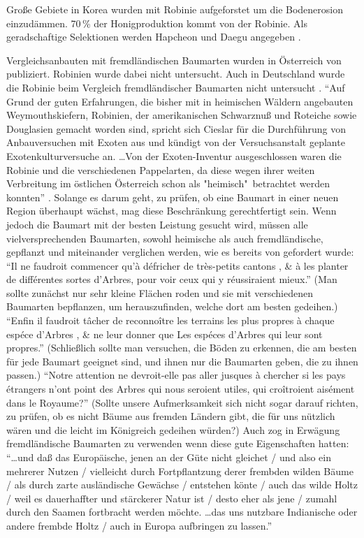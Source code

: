 \documentclass[twocolumn]{scrartcl}
\begin{document}
Große Gebiete in Korea wurden mit Robinie aufgeforstet um die
Bodenerosion einzudämmen. 70\,\% der Honigproduktion kommt von der
Robinie. Als geradschaftige Selektionen werden Hapcheon und Daegu
angegeben \citep{lee2007robinieKorea}.

Vergleichsanbauten mit fremdländischen Baumarten wurden in Österreich
von \citet{cieslar1901fremdlaendischeHolzarten} publiziert. Robinien
wurde dabei nicht untersucht. Auch in Deutschland wurde die Robinie
beim Vergleich fremdländischer Baumarten
nicht untersucht \citep{schwappach1901fremdlaendischeHolzarten}.
\enquote{Auf Grund der guten Erfahrungen, die bisher mit in heimischen
Wäldern angebauten Weymouthskiefern, Robinien, der amerikanischen
Schwarznuß und Roteiche sowie Douglasien gemacht worden sind, spricht
sich Cieslar für die Durchführung von Anbauversuchen mit Exoten aus
und kündigt von der Versuchsanstalt geplante Exotenkulturversuche
an. \dots Von der Exoten-Inventur ausgeschlossen waren die Robinie und
die verschiedenen Pappelarten, da diese wegen ihrer weiten Verbreitung
im östlichen Österreich schon als "heimisch"\ betrachtet werden
konnten} \citep{rannert1979fremdlaendischeBaumarten}. Solange es
darum geht, zu prüfen, ob eine Baumart in einer neuen Region überhaupt
wächst, mag diese Beschränkung gerechtfertigt sein.
Wenn jedoch die Baumart mit der besten Leistung gesucht wird,
müssen alle vielversprechenden Baumarten,
sowohl heimische als auch fremdländische, gepflanzt und miteinander verglichen werden,
wie es bereits von \citet[S.~300]{reaumur1721ertragstafel} gefordert wurde:
\enquote{Il ne faudroit commencer qu’à défricher de très-petits cantons , \& à les planter de différentes sortes d'Arbres, pour voir ceux qui y réussiraient mieux.} (Man sollte zunächst nur sehr kleine Flächen roden und sie mit verschiedenen Baumarten bepflanzen, um herauszufinden, welche dort am besten gedeihen.)
\enquote{Enfin il faudroit tâcher de reconnoître les terrains les plus  propres à chaque espéce d’Arbres , \& ne leur donner que Les espéces d’Arbres qui leur sont propres.} (Schließlich sollte man versuchen, die Böden zu erkennen, die am besten für jede Baumart geeignet sind, und ihnen nur die Baumarten geben, die zu ihnen passen.)
\enquote{Notre attention ne devroit-elle pas aller jusques à chercher si les pays étrangers n'ont point des Arbres qui nous seroient utiles, qui croîtroient aisément dans le Royaume?} (Sollte unsere Aufmerksamkeit sich nicht sogar darauf richten, zu prüfen, ob es nicht Bäume aus fremden Ländern gibt, die für uns nützlich wären und die leicht im Königreich gedeihen würden?)
Auch \citet[S.~253]{carlowitz1713sylvicultura} zog in Erwägung fremdländische
Baumarten zu verwenden wenn diese gute Eigenschaften hatten: \enquote{\dots und daß das Europäische, jenen an der Güte nicht gleichet / und also ein mehrerer Nutzen / vielleicht durch Fortpflantzung derer frembden wilden Bäume / als durch zarte ausländische Gewächse / entstehen könte / auch das wilde Holtz / weil es dauerhaffter  und stärckerer Natur ist / desto eher als jene / zumahl durch den Saamen fortbracht werden möchte.  \dots  das uns nutzbare Indianische oder andere frembde Holtz / auch in Europa aufbringen zu lassen.}
\end{document}
